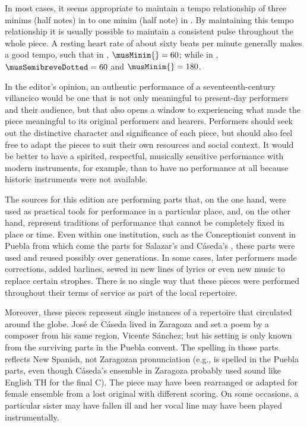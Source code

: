 In most cases, it seems appropriate to maintain a tempo relationship of three
minims (half notes) in \meterCThree{} to one minim (half note) in \meterC{}.
By maintaining this tempo relationship it is usually possible to maintain a
consistent pulse throughout the whole piece.
A resting heart rate of about sixty beats per minute generally makes a good
tempo, such that in \meterC{}, $\musMinim{} = 60$; while in \meterCThree,
$\musSemibreveDotted = 60$ and $\musMinim{} = 180$.


In the editor's opinion, an authentic performance of a seventeenth-century
villancico would be one that is not only meaningful to present-day performers
and their audience, but that also opens a window to experiencing what made the
piece meaningful to its original performers and hearers.
Performers should seek out the distinctive character and significance of each
piece, but should also feel free to adapt the pieces to suit their own resources
and social context.
It would be better to have a spirited, respectful, musically sensitive
performance with modern instruments, for example, than to have no performance
at all because historic instruments were not available.

The sources for this edition are performing parts that, on the one hand,
were used as practical tools for performance in a particular place, and, on the
other hand, represent traditions of performance that cannot be completely fixed
in place or time.
Even within one institution, such as the Conceptionist convent in Puebla from
which come the parts for Salazar's  and Cáseda's
, these parts were used and reused possibly over
generations. 
In some cases, later performers made corrections, added barlines, sewed in new
lines of lyrics or even new music to replace certain strophes.
There is no single way that these pieces were performed throughout their terms
of service as part of the local repertoire.

Moreover, these pieces represent single instances of a repertoire that
circulated around the globe. 
José de Cáseda lived in Zaragoza and set a poem by a composer from his same
region, Vicente Sánchez; but his setting is only known from the surviving parts
in the Puebla convent.
The spelling in those parts reflects New Spanish, not Zaragozan pronunciation
(e.g.,  is spelled  in the
Puebla parts, even though Cáseda's ensemble in Zaragoza probably used sound like
English TH for the final C).
The piece may have been rearranged or adapted for female ensemble from a lost
original with different scoring.
On some occasions, a particular sister may have fallen ill and her vocal line
may have been played instrumentally.

